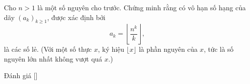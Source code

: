 \ifshowproblem
\begin{problem}\label{problem:IND-2015-TST4-P3}
	Cho $n > 1$ là một số nguyên cho trước. Chứng minh rằng có vô hạn số hạng của dãy $(a_k)_{k \ge 1}$, được xác định bởi
	\[
		a_k = \left\lfloor \frac{n^k}{k} \right\rfloor,
	\]
	là các số lẻ. (Với một số thực $x$, ký hiệu $\lfloor x \rfloor$ là phần nguyên của $x$, tức là số nguyên lớn nhất không vượt quá $x$.)
\end{problem}
\fi

\ifshowinfo
Đánh giá [\textbf{}]\footnotemark
{}
\fi